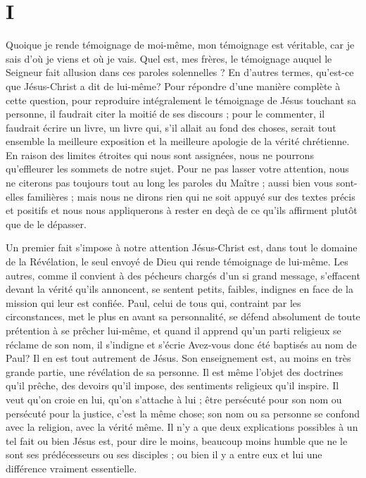 \section{I}

\Og{} Quoique je rende témoignage de moi-même, mon témoignage est véritable, car je sais d’où je viens et où je vais.\Fg{} Quel est, mes frères, le témoignage auquel le Seigneur fait allusion dans ces paroles solennelles ? En d’autres termes, qu’est-ce que Jésus-Christ a dit de lui-même? Pour répondre d’une manière complète à cette question, pour reproduire intégralement le témoignage de Jésus touchant sa personne, il faudrait citer la moitié de ses discours ; pour le commenter, il faudrait écrire un livre, un livre qui, s’il allait au fond des choses, serait tout ensemble la meilleure exposition et la meilleure apologie de la vérité chrétienne. En raison des limites étroites qui nous sont assignées, nous ne pourrons qu’effleurer les sommets de notre sujet. Pour ne pas lasser votre attention, nous ne citerons pas toujours tout au long les paroles du Maître ; aussi bien vous sont-elles familières ; mais nous ne dirons rien qui ne soit appuyé sur des textes précis et positifs et nous nous appliquerons à rester en deçà de ce qu’ils affirment plutôt que de le dépasser.

Un premier fait s’impose à notre attention\frcolon{} Jésus-Christ est, dans tout le domaine de la Révélation, le seul envoyé de Dieu qui rende témoignage de lui-même. Les autres, comme il convient à des pécheurs chargés d’un si grand message, s’effacent devant la vérité qu’ils annoncent, se sentent petits, faibles, indignes en face de la mission qui leur est confiée. Paul, celui de tous qui, contraint par les circonstances, met le plus en avant sa personnalité, se défend absolument de toute prétention à se prêcher lui-même, et quand il apprend qu’un parti religieux se réclame de son nom, il s’indigne et s’écrie\frcolon{} \Og{} Avez-vous donc été baptisés au nom de Paul?\Fg{} Il en est tout autrement de Jésus. Son enseignement est, au moins en très grande partie, une révélation de sa personne. Il est même l’objet des doctrines qu’il prêche, des devoirs qu’il impose, des sentiments religieux qu’il inspire. Il veut qu’on croie en lui, qu’on s’attache à lui ; être persécuté pour son nom ou persécuté pour la justice, c’est la même chose; son nom ou sa personne se confond avec la religion, avec la vérité même. Il n’y a que deux explications possibles à un tel fait\frcolon{} ou bien Jésus est, pour dire le moins, beaucoup moins humble que ne le sont ses prédécesseurs ou ses disciples ; ou bien il y a entre eux et lui une différence vraiment essentielle.

